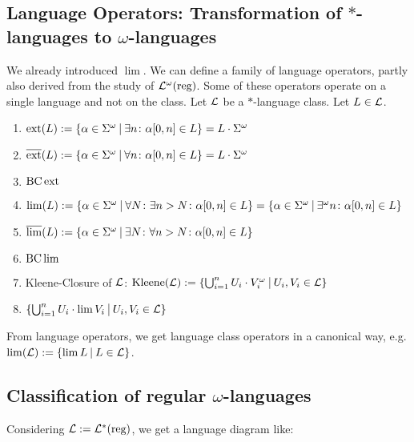 
\subsection{Language Operators: Transformation of $*$-languages to $\omega$-languages}

We already introduced $\lim$. We can define a family of language operators, partly also derived from the study of $\mathcal{L}^\omega(\text{reg})$. Some of these operators operate on a single language and not on the class. Let $\mathcal{L}$ be a $*$-language class. Let $L \in \mathcal{L}$.

\begin{enumerate}
\item $\ext(L) := \Set{\alpha \in \Sigma^\omega}{ \exists n \colon \alpha[0,n] \in L} = L \cdot \Sigma^\omega$
\item $\dext(L) := \Set{\alpha \in \Sigma^\omega}{ \forall n \colon \alpha[0,n] \in L} = L \cdot \Sigma^\omega$
\item $\operatorname{BC} \operatorname{ext}$
\item $\lim(L) := \Set{ \alpha \in \Sigma^\omega }{ \forall N \colon \exists n > N \colon \alpha[0,n] \in L } = \Set{ \alpha \in \Sigma^\omega }{ \exists^\omega n \colon \alpha[0,n] \in L }$
\item $\dlim(L) := \Set{ \alpha \in \Sigma^\omega }{ \exists N \colon \forall n > N \colon \alpha[0,n] \in L }$
\item $\operatorname{BC} \lim$
\item Kleene-Closure of $\mathcal{L}$: $\Kleene(\Lang) := \Set{ \bigcup_{i=1}^n U_i \cdot V_i^\omega}{U_i, V_i \in \Lang}$
\item $\Set{\bigcup_{i=1}^n U_i \cdot \lim V_i}{U_i, V_i \in \Lang}$
\end{enumerate}

From language operators, we get language class operators in a canonical way, e.g. $\lim(\Lang) := \Set{\lim L}{L \in \Lang}$.

\subsection{Classification of regular $\omega$-languages} %

Considering $\mathcal{L} := \mathcal{L}^*(\text{reg})$, we get a language diagram like:

